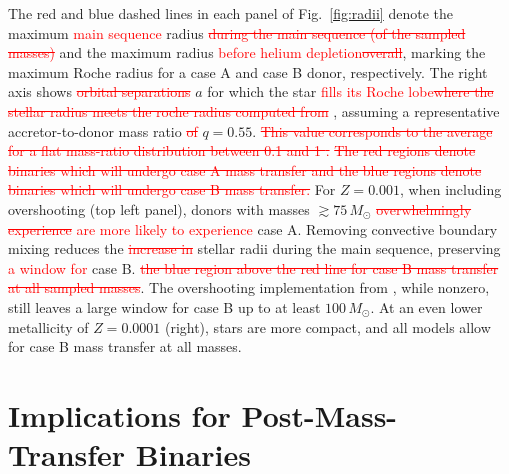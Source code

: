 \documentclass[twocolumn]{aastex63}
\DeclareRobustCommand{\Figref}[1]{Fig.~\ref{#1}}
\newcommand{\cut}[1]{\textcolor{red}{\sout{#1}}}
\begin{document}
The red and blue dashed lines in each panel of \Figref{fig:radii}
denote the maximum \textcolor{red}{main sequence} radius \cut{during
  the main sequence (of the sampled masses)} and the maximum radius
\textcolor{red}{before helium depletion}\cut{overall}, marking the
maximum Roche radius for a case A and case B donor, respectively. The
right axis shows \cut{orbital separations} $a$ for which the star
\textcolor{red}{fills its Roche lobe}\cut{where the stellar radius
  meets the roche radius computed from} \citet{eggleton:83}, assuming
a representative accretor-to-donor mass ratio \cut{of} $q=0.55$.
\cut{This value corresponds to the average for a flat mass-ratio
  distribution between 0.1 and 1 \citep{kobulnicky:07,sana:12}.}
\cut{The red regions denote binaries which will undergo case A mass
  transfer and the blue regions denote binaries which will undergo
  case B mass transfer.} For $Z=0.001$, when including overshooting
(top left panel), donors with masses $ \gtrsim 75 \, M_{\odot}$
\cut{overwhelmingly experience} \textcolor{red}{are more likely to
  experience} case A. Removing convective boundary mixing reduces the
\cut{increase in} stellar radii during the main sequence, preserving
\textcolor{red}{a window for} case B. \cut{the blue region above the red line
  for case B mass transfer at all sampled masses}. The overshooting
implementation from \cite{pols:98}, while nonzero, still leaves a
large window for case B up to at least $100 \, M_{\odot}$. At an even
lower metallicity of $Z=0.0001$ (right), stars are more compact, and
all models allow for case B mass transfer at all masses.

\section{Implications for Post-Mass-Transfer Binaries}
\end{document}
